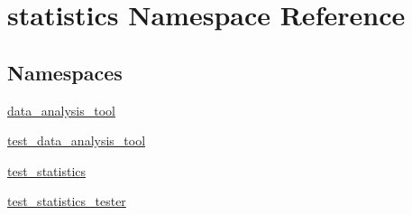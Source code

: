 \hypertarget{namespacestatistics}{}\section{statistics Namespace Reference}
\label{namespacestatistics}
\subsection*{Namespaces}
\begin{DoxyCompactItemize}
\item 
 \hyperlink{namespacestatistics_1_1data__analysis__tool}{data\+\_\+analysis\+\_\+tool}
\item 
 \hyperlink{namespacestatistics_1_1test__data__analysis__tool}{test\+\_\+data\+\_\+analysis\+\_\+tool}
\item 
 \hyperlink{namespacestatistics_1_1test__statistics}{test\+\_\+statistics}
\item 
 \hyperlink{namespacestatistics_1_1test__statistics__tester}{test\+\_\+statistics\+\_\+tester}
\end{DoxyCompactItemize}
